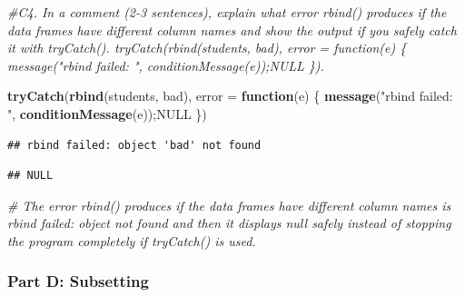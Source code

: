 \documentclass[
]{article}
\newenvironment{Shaded}{\begin{snugshade}}{\end{snugshade}}
\newcommand{\AttributeTok}[1]{\textcolor[rgb]{0.13,0.29,0.53}{#1}}
\newcommand{\CommentTok}[1]{\textcolor[rgb]{0.56,0.35,0.01}{\textit{#1}}}
\newcommand{\ConstantTok}[1]{\textcolor[rgb]{0.56,0.35,0.01}{#1}}
\newcommand{\ControlFlowTok}[1]{\textcolor[rgb]{0.13,0.29,0.53}{\textbf{#1}}}
\newcommand{\FunctionTok}[1]{\textcolor[rgb]{0.13,0.29,0.53}{\textbf{#1}}}
\newcommand{\NormalTok}[1]{#1}
\newcommand{\SpecialCharTok}[1]{\textcolor[rgb]{0.81,0.36,0.00}{\textbf{#1}}}
\newcommand{\StringTok}[1]{\textcolor[rgb]{0.31,0.60,0.02}{#1}}
\begin{document}
\begin{Shaded}
\begin{Highlighting}[]
\CommentTok{\#C4. In a comment (2{-}3 sentences), explain what error rbind() produces if the data frames have different column names and show the output if you safely catch it with tryCatch(). tryCatch(rbind(students, bad), error = function(e) \{ message("rbind failed: ", conditionMessage(e));NULL \}).}

\FunctionTok{tryCatch}\NormalTok{(}\FunctionTok{rbind}\NormalTok{(students, bad), }\AttributeTok{error =} \ControlFlowTok{function}\NormalTok{(e) \{ }\FunctionTok{message}\NormalTok{(}\StringTok{"rbind failed: "}\NormalTok{, }\FunctionTok{conditionMessage}\NormalTok{(e));}\ConstantTok{NULL}\NormalTok{ \})}
\end{Highlighting}
\end{Shaded}

\begin{verbatim}
## rbind failed: object 'bad' not found
\end{verbatim}

\begin{verbatim}
## NULL
\end{verbatim}

\begin{Shaded}
\begin{Highlighting}[]
\CommentTok{\# The error rbind() produces if the data frames have different column names is rbind failed: object \textquotesingle{}\textquotesingle{} not found and then it displays null safely instead of stopping the program completely if tryCatch() is used.}
\end{Highlighting}
\end{Shaded}

\subsubsection{Part D: Subsetting}\label{part-d-subsetting}

\begin{Shaded}
\end{Shaded}
\end{document}
